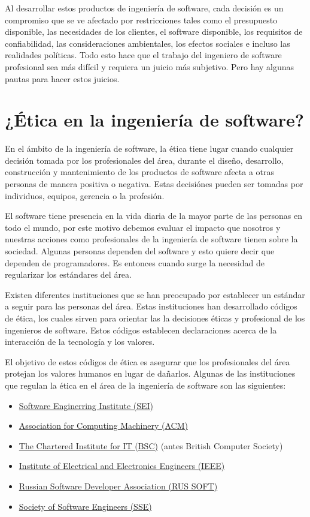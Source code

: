 \documentclass[twoside]{article}
\begin{document}
\begin{multicols}{2}
Al desarrollar estos productos de ingeniería de software, cada decisión es un
compromiso que se ve afectado por restricciones tales como el presupuesto
disponible, las necesidades de los clientes, el software disponible, los
requisitos de confiabilidad, las consideraciones ambientales, los efectos
sociales e incluso las realidades políticas. Todo esto hace que el trabajo del
ingeniero de software profesional sea más difícil y requiera un juicio más
subjetivo. Pero hay algunas pautas para hacer estos juicios.

\section{¿Ética en la ingeniería de software?}

En el ámbito de la ingeniería de software, la ética tiene lugar cuando cualquier
decisión tomada por los profesionales del área, durante el diseño, desarrollo,
construcción y mantenimiento de los productos de software afecta a otras
personas de manera positiva o negativa. Estas decisiónes pueden ser tomadas por
individuos, equipos, gerencia o la profesión.

El software tiene presencia en la vida diaria de la mayor parte de las personas
en todo el mundo, por este motivo debemos evaluar el impacto que nosotros y
nuestras acciones como profesionales de la ingeniería de software tienen sobre
la sociedad. Algunas personas dependen del software y esto quiere decir que
dependen de programadores. Es entonces cuando surge la necesidad de regularizar
los estándares del área.

Existen diferentes instituciones que se han preocupado por establecer un
estándar a seguir para las personas del área. Estas instituciones han
desarrollado códigos de ética, los cuales sirven para orientar las la decisiones
éticas y profesional de los ingenieros de software. Estos códigos establecen
declaraciones acerca de la interacción de la tecnología y los valores.

El objetivo de estos códigos de ética es asegurar que los profesionales del área
protejan los valores humanos en lugar de dañarlos. Algunas de las instituciones
que regulan la ética en el área de la ingeniería de software son las siguientes:

\begin{itemize}
    \item \href{https://www.sei.cmu.edu/}{Software Enginerring Institute (SEI)}
    \item \href{https://www.acm.org/}{Association for Computing Machinery (ACM)}
\item \href{https://www.bcs.org/}{The Chartered Institute for IT (BSC)} (antes
British Computer Society)
\item \href{https://www.ieee.org/}{Institute of Electrical and Electronics
Engineers (IEEE)} \cite{rogerson2002software}
    \item \href{https://russoft.org/}{Russian Software Developer Association (RUS SOFT)}
    \item \href{https://sse.rit.edu/}{Society of Software Engineers (SSE)}
\end{itemize}


\end{multicols}
\end{document}
